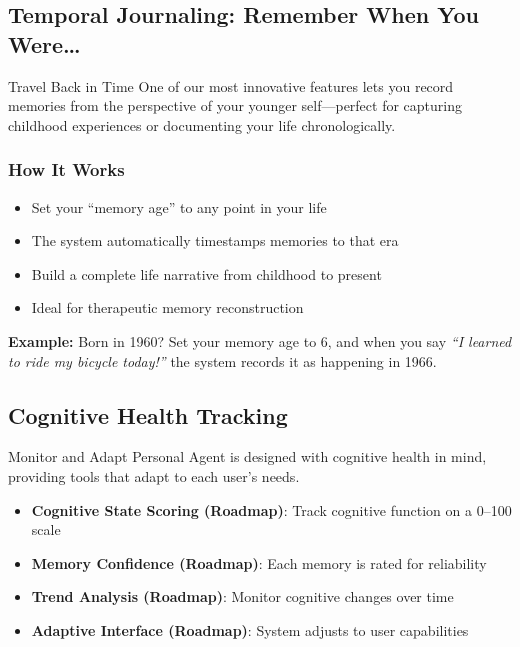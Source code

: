 \documentclass[11pt,letterpaper]{article}
\begin{document}
\subsection{Temporal Journaling: Remember When You Were\ldots}

\begin{featurebox}{Travel Back in Time}
One of our most innovative features lets you record memories from the perspective of your younger self---perfect for capturing childhood experiences or documenting your life chronologically.
\end{featurebox}

\subsubsection{How It Works}
\begin{itemize}[leftmargin=*]
    \item Set your ``memory age'' to any point in your life
    \item The system automatically timestamps memories to that era
    \item Build a complete life narrative from childhood to present
    \item Ideal for therapeutic memory reconstruction
\end{itemize}

\textbf{Example:} Born in 1960? Set your memory age to 6, and when you say \textit{``I learned to ride my bicycle today!''} the system records it as happening in 1966.

\subsection{Cognitive Health Tracking}

\begin{featurebox}{Monitor and Adapt}
Personal Agent is designed with cognitive health in mind, providing tools that adapt to each user's needs.
\end{featurebox}

\begin{itemize}[leftmargin=*]
    \item \textbf{Cognitive State Scoring (Roadmap)}: Track cognitive function on a 0--100 scale
    \item \textbf{Memory Confidence (Roadmap)}: Each memory is rated for reliability
    \item \textbf{Trend Analysis (Roadmap)}: Monitor cognitive changes over time
    \item \textbf{Adaptive Interface (Roadmap)}: System adjusts to user capabilities
\end{itemize}
\end{document}
